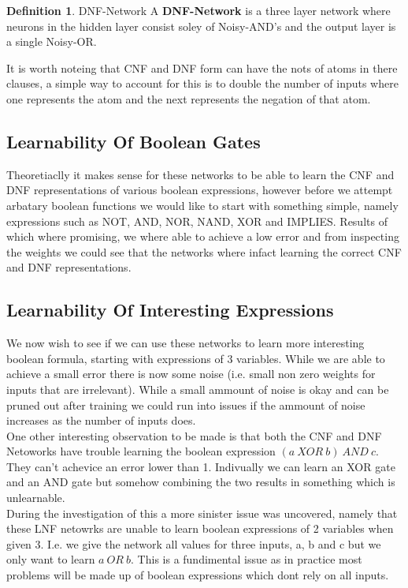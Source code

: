 \documentclass{article}
\theoremstyle{definition}
\newtheorem{definition}{Definition}[section]
\begin{document}
\theoremstyle{definition}
\begin{definition}{DNF-Network}
A \textbf{DNF-Network} is a three layer network where neurons in the hidden layer consist soley of Noisy-AND's and the output layer is a single Noisy-OR. 
\end{definition}

It is worth noteing that CNF and DNF form can have the nots of atoms in there clauses, a simple way to account for this is to double the number of inputs where one represents the atom and the next represents the negation of that atom.

\subsection{Learnability Of Boolean Gates}
Theoretiaclly it makes sense for these networks to be able to learn the CNF and DNF representations of various boolean expressions, however before we attempt arbatary boolean functions we would like to start with something simple, namely expressions such as NOT, AND, NOR, NAND, XOR and IMPLIES. Results of which where promising, we where able to achieve a low error and from inspecting the weights we could see that the networks where infact learning the correct CNF and DNF representations.\\

\subsection{Learnability Of Interesting Expressions}
We now wish to see if we can use these networks to learn more interesting boolean formula, starting with expressions of 3 variables. While we are able to achieve a small error there is now some noise (i.e. small non zero weights for inputs that are irrelevant). While a small ammount of noise is okay and can be pruned out after training we could run into issues if the ammount of noise increases as the number of inputs does. \\

One other interesting observation to be made is that both the CNF and DNF Netoworks have trouble learning the boolean expression $(a\ XOR\ b)\ AND\ c$. They can't achevice an error lower than 1. Indivually we can learn an XOR gate and an AND gate but somehow combining the two results in something which is unlearnable.\\

During the investigation of this a more sinister issue was uncovered, namely that these LNF netowrks are unable to learn boolean expressions of 2 variables when given 3. I.e. we give the network all values for three inputs, a, b and c but we only want to learn $a\ OR\ b$. This is a fundimental issue as in practice most problems will be made up of boolean expressions which dont rely on all inputs.

\medskip


\end{document}
